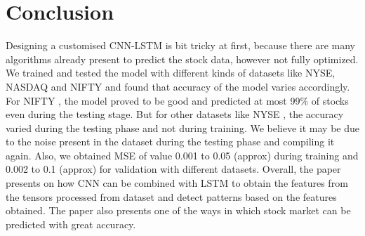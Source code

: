 \documentclass[conference]{IEEEtran}
\begin{document}
\section {Conclusion}
Designing a customised CNN-LSTM is bit tricky at first, because there are many algorithms already present to predict the stock data, however not fully optimized. We trained and tested the model with different kinds of datasets like NYSE, NASDAQ and NIFTY and found that accuracy of the model varies accordingly. For NIFTY \cite {b11}, the model proved to be good and predicted at most 99\% of stocks even during the testing stage. But for other datasets like NYSE \cite{b12}, the accuracy varied during the testing phase and not during training. We believe it may be due to the noise present in the dataset during the testing phase and compiling it again. Also, we obtained MSE of value 0.001 to 0.05 (approx) during training and 0.002 to 0.1 (approx) for validation with different datasets. Overall, the paper presents on how CNN can be combined with LSTM to obtain the features from the tensors processed from dataset and detect patterns based on the features obtained. The paper also presents one of the ways in which stock market can be predicted with great accuracy.
\end{document}
